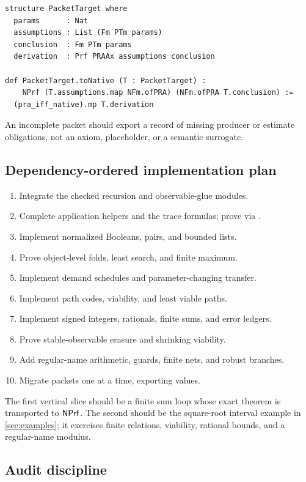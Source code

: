 \begin{lstlisting}
structure PacketTarget where
  params      : Nat
  assumptions : List (Fm PTm params)
  conclusion  : Fm PTm params
  derivation  : Prf PRAAx assumptions conclusion

def PacketTarget.toNative (T : PacketTarget) :
    NPrf (T.assumptions.map NFm.ofPRA) (NFm.ofPRA T.conclusion) :=
  (pra_iff_native).mp T.derivation
\end{lstlisting}

An incomplete packet should export a record of missing producer or estimate
obligations, not an axiom,  placeholder, or a semantic surrogate.

\subsection{Dependency-ordered implementation plan}

\begin{enumerate}[label=\textbf{M\arabic*.}]
\item Integrate the checked recursion and observable-glue modules.
\item Complete application helpers and the trace formulas; prove
       via .
\item Implement normalized Booleans, pairs, and bounded lists.
\item Prove object-level folds, least search, and finite maximum.
\item Implement demand schedules and parameter-changing transfer.
\item Implement path codes, viability, and least viable paths.
\item Implement signed integers, rationals, finite sums, and error ledgers.
\item Prove stable-observable erasure and shrinking viability.
\item Add regular-name arithmetic, guards, finite nets, and robust branches.
\item Migrate packets one at a time, exporting  values.
\end{enumerate}

The first vertical slice should be a finite sum loop whose exact theorem is
transported to \(\mathsf{NPrf}\).  The second should be the square-root interval example
in \cref{sec:examples}; it exercises finite relations, viability, rational
bounds, and a regular-name modulus.

\subsection{Audit discipline}

